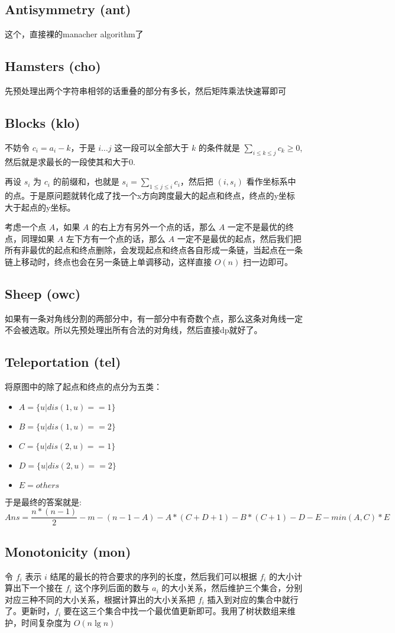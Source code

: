 \documentclass[a4paper,11pt]{article}
\begin{document}
\subsection*{Antisymmetry (ant)}
这个，直接裸的manacher algorithm了
\subsection*{Hamsters (cho)}
先预处理出两个字符串相邻的话重叠的部分有多长，然后矩阵乘法快速幂即可
\subsection*{Blocks (klo)}
不妨令 $c_i = a_i - k$，于是 $i\dots j$ 这一段可以全部大于 $k$ 的条件就是 $\displaystyle \sum_{i\le k\le j} c_k \ge 0$, 然后就是求最长的一段使其和大于0.

再设 $s_i$ 为 $c_i$ 的前缀和，也就是 $\displaystyle s_i = \sum_{1\le j\le i} c_i$，然后把 $(i, s_i)$ 看作坐标系中的点。于是原问题就转化成了找一个x方向跨度最大的起点和终点，终点的y坐标大于起点的y坐标。

考虑一个点 $A$，如果 $A$ 的右上方有另外一个点的话，那么 $A$ 一定不是最优的终点，同理如果 $A$ 左下方有一个点的话，那么 $A$ 一定不是最优的起点，然后我们把所有非最优的起点和终点删除，会发现起点和终点各自形成一条链，当起点在一条链上移动时，终点也会在另一条链上单调移动，这样直接 $O(n)$ 扫一边即可。
\subsection*{Sheep (owc)}
如果有一条对角线分割的两部分中，有一部分中有奇数个点，那么这条对角线一定不会被选取。所以先预处理出所有合法的对角线，然后直接dp就好了。
\subsection*{Teleportation (tel)}
将原图中的除了起点和终点的点分为五类：
\begin{itemize}
	\item$A = \{u | dis(1,u) == 1\}$
	\item$B = \{u | dis(1,u) == 2\}$
	\item$C = \{u | dis(2,u) == 1\}$
	\item$D = \{u | dis(2,u) == 2\}$
	\item$E = others$
\end{itemize}

于是最终的答案就是: $$Ans = \frac{n * (n - 1)}{2} - m - (n - 1 - A) - A * (C + D + 1) - B * (C + 1) - D - E - min(A, C) * E$$
\subsection*{Monotonicity (mon)}
令 $f_i$ 表示 $i$ 结尾的最长的符合要求的序列的长度，然后我们可以根据 $f_i$ 的大小计算出下一个接在 $f_i$ 这个序列后面的数与 $a_i$ 的大小关系，然后维护三个集合，分别对应三种不同的大小关系，根据计算出的大小关系把 $f_i$ 插入到对应的集合中就行了。更新时，$f_i$ 要在这三个集合中找一个最优值更新即可。我用了树状数组来维护，时间复杂度为 $O(n\lg n)$ 
\end{document}
